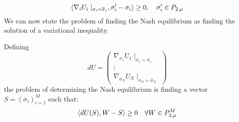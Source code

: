 \begin{equation}
  \ip{\nabla_i U_i \mid_{\sigma_i = \overbar{\sigma}_i}}{\sigma_i' -\sigma_i} \geq 0, \quad \sigma_i' \in P_{2,\mu}
\end{equation}
We can now state the problem of finding the Nash equilibrium  as finding the solution of a variational inequality.
\begin{definition}
  \label{def:var_eq_nash}
  Defining
\begin{equation}
  dU = \begin{pmatrix} \nabla_{\sigma_1} U_1 \mid_{\sigma_1 = \overbar{\sigma}_1}\\
      \vdots \\
      \nabla_{\sigma_N} U_N \mid_{\sigma_N = \overbar{\sigma}_N} \end{pmatrix}
\end{equation}
the problem of determining the Nash equilibrium  is finding a vector $S = (\sigma_i)_{i=1}^M$ such that:
\begin{equation}
  \left \langle dU(S),W-S \right \rangle \geq 0 \quad \forall W\in P_{2,\mu}^M
\end{equation}
\end{definition}


